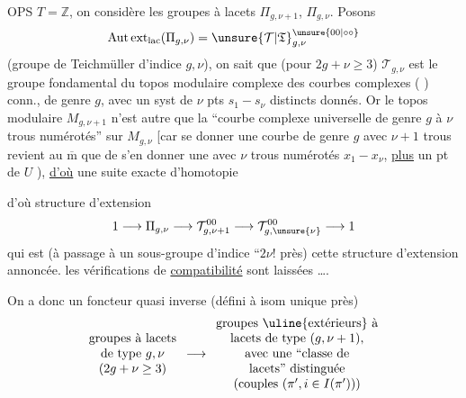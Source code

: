 OPS \(T=\mathbb Z\), on considère les groupes à lacets  \(\Pi_{g,\nu+1}\), \(\Pi_{g,\nu}\). Posons
\[
\operatorname{Aut\,ext}_{\mathrm{lac}}(\Pi_{g,\nu})
=\unsure{\mathcal T|\mathfrak T}_{g,\nu}^{\unsure{00|\circ\circ}}
\]
(groupe de Teichmüller d'indice \(g,\nu\)),
on sait que (pour \(2g+\nu\ge3\)) \(\mathcal T_{g,\nu}\) est le groupe fondamental du topos modulaire complexe  des courbes complexes ( ) conn., de genre \(g\), avec un syst de \(\nu\) pts \(s_1-\!s_\nu\) distincts donnés.
Or le topos modulaire \(M_{g,\nu+1}\) n'est autre que  la ``courbe complexe universelle  de genre \(g\) à \(\nu\) trous numérotés'' sur \(M_{g,\nu}\)
[car se donner une courbe  de genre \(g\) avec \(\nu+1\) trous  revient au \(\overline{\mathrm m}\) que de s'en donner une  avec \(\nu\) trous numérotés \(x_1-\!x_\nu\), \uline{plus} un  pt de \(U\) ), \uline{d'où} une suite exacte d'homotopie


d'où  structure d'extension 
\[
1\longrightarrow\Pi_{g,\nu}
\longrightarrow\mathcal T^{00}_{g,\nu+1}
\longrightarrow\mathcal T^{00}_{g,\unsure{\nu}}
\longrightarrow1
\]
qui est (à passage à un sous-groupe d'indice ``\(2\nu!\) près) cette structure d'extension annoncée. \unsure{\&} les vérifications de \uline{compatibilité} sont laissées \ldots.

On a donc un foncteur quasi inverse (défini à isom unique près)
\[
\begin{array}{c}
\text{groupes à lacets}\\
\text{de type }g,\nu\\
(2g+\nu\ge3)
\end{array}
\longrightarrow
\begin{array}{c}
\text{groupes \uline{extérieurs} à}\\
\text{lacets de type }(g,\nu+1),\\
\text{avec une ``classe de}\\
\text{lacets'' distinguée}\\
\text{(couples }(\pi',i\in I(\pi'))\text{)}
\end{array}
\]

